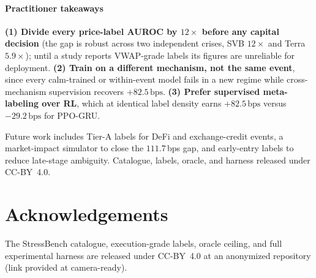 \documentclass[sigconf,anonymous,natbib=false]{acmart}
\newcommand{\bps}{\,\text{bps}}
\begin{document}
\paragraph{Practitioner takeaways}
\textbf{(1) Divide every price-label AUROC by $12\times$ before any capital decision}
(the gap is robust across two independent crises, SVB $12\times$ and Terra $5.9\times$);
until a study reports VWAP-grade labels its figures are unreliable for deployment.
\textbf{(2) Train on a different mechanism, not the same event}, since every
calm-trained or within-event model fails in a new regime while cross-mechanism
supervision recovers $+82.5\bps$.
\textbf{(3) Prefer supervised meta-labeling over RL}, which at identical label
density earns $+82.5\bps$ versus $-29.2\bps$ for PPO-GRU.

Future work includes Tier-A labels for DeFi and exchange-credit events, a market-impact simulator to close the $111.7$\,bps gap, and early-entry labels to reduce late-stage ambiguity.
Catalogue, labels, oracle, and harness released under CC-BY~4.0.


\section*{Acknowledgements}
The StressBench catalogue, execution-grade labels, oracle ceiling, and full
experimental harness are released under CC-BY~4.0 at an anonymized repository
(link provided at camera-ready).
\end{document}
